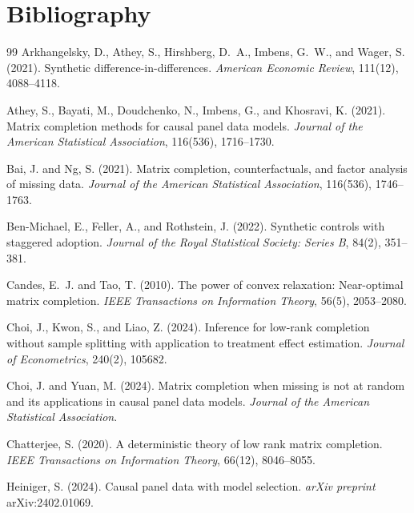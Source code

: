 \documentclass[11pt]{article}
\theoremstyle{definition}
\theoremstyle{plain}
\theoremstyle{remark}
\begin{document}
\section*{Bibliography}
\begin{thebibliography}{99}
Arkhangelsky, D., Athey, S., Hirshberg, D.~A., Imbens, G.~W., and Wager, S.
(2021). Synthetic difference-in-differences. \emph{American Economic Review},
111(12), 4088--4118.

Athey, S., Bayati, M., Doudchenko, N., Imbens, G., and Khosravi, K. (2021).
Matrix completion methods for causal panel data models. \emph{Journal of the
American Statistical Association}, 116(536), 1716--1730.

Bai, J. and Ng, S. (2021). Matrix completion, counterfactuals, and factor
analysis of missing data. \emph{Journal of the American Statistical
Association}, 116(536), 1746--1763.

Ben-Michael, E., Feller, A., and Rothstein, J. (2022). Synthetic controls with
staggered adoption. \emph{Journal of the Royal Statistical Society: Series B},
84(2), 351--381.

Candes, E.~J. and Tao, T. (2010). The power of convex relaxation: Near-optimal
matrix completion. \emph{IEEE Transactions on Information Theory}, 56(5),
2053--2080.

Choi, J., Kwon, S., and Liao, Z. (2024). Inference for low-rank completion
without sample splitting with application to treatment effect estimation.
\emph{Journal of Econometrics}, 240(2), 105682.

Choi, J. and Yuan, M. (2024). Matrix completion when missing is not at random
and its applications in causal panel data models. \emph{Journal of the
American Statistical Association}.

Chatterjee, S. (2020). A deterministic theory of low rank matrix completion.
\emph{IEEE Transactions on Information Theory}, 66(12), 8046--8055.

Heiniger, S. (2024). Causal panel data with model selection. \emph{arXiv
preprint} arXiv:2402.01069.


\end{thebibliography}
\end{document}
